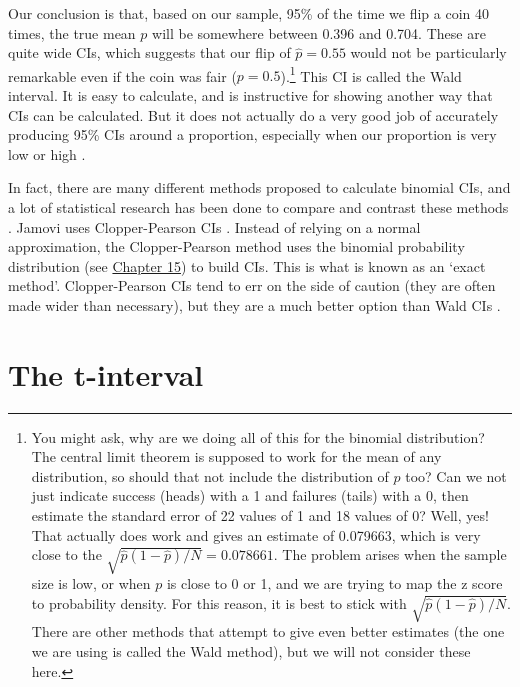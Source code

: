 \documentclass[
  openany]{scrbook}
\begin{document}
Our conclusion is that, based on our sample, 95\% of the time we flip a coin 40 times, the true mean \(p\) will be somewhere between 0.396 and 0.704.
These are quite wide CIs, which suggests that our flip of \(\hat{p} = 0.55\) would not be particularly remarkable even if the coin was fair (\(p = 0.5\)).\footnote{You might ask, why are we doing all of this for the binomial distribution? The central limit theorem is supposed to work for the mean of any distribution, so should that not include the distribution of \(p\) too? Can we not just indicate success (heads) with a 1 and failures (tails) with a 0, then estimate the standard error of 22 values of 1 and 18 values of 0? Well, yes! That actually does work and gives an estimate of 0.079663, which is very close to the \(\sqrt{\hat{p}(1-\hat{p})/N} = 0.078661\). The problem arises when the sample size is low, or when \(p\) is close to 0 or 1, and we are trying to map the z score to probability density. For this reason, it is best to stick with \(\sqrt{\hat{p}(1-\hat{p})/N}\). There are other methods that attempt to give even better estimates (the one we are using is called the Wald method), but we will not consider these here.}
This CI is called the Wald interval.
It is easy to calculate, and is instructive for showing another way that CIs can be calculated.
But it does not actually do a very good job of accurately producing 95\% CIs around a proportion, especially when our proportion is very low or high \citep{Schilling2014, Andersson2023}.

In fact, there are many different methods proposed to calculate binomial CIs, and a lot of statistical research has been done to compare and contrast these methods \citep{Reed2007, Thulin2014, Schilling2014}.
Jamovi uses Clopper-Pearson CIs \citep{Clopper1934}.
Instead of relying on a normal approximation, the Clopper-Pearson method uses the binomial probability distribution (see \protect\hyperlink{Chapter_15}{Chapter 15}) to build CIs.
This is what is known as an `exact method'.
Clopper-Pearson CIs tend to err on the side of caution (they are often made wider than necessary), but they are a much better option than Wald CIs \citep{Reed2007}.

\hypertarget{Chapter_19}{%
\chapter{The t-interval}\label{Chapter_19}}
\end{document}
